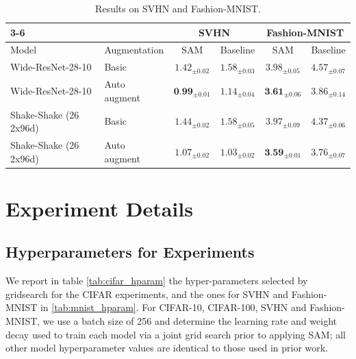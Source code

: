 \documentclass{article} %
\begin{document}
\begin{table}[h]
\caption{Results on SVHN and Fashion-MNIST.}
\vspace{0.1cm}
\label{tab:svhn_results}
\centering
\begin{tabular}{ll|cc|cc|}
\cline{3-6}
                                             &                                        & \multicolumn{2}{c|}{SVHN} & \multicolumn{2}{c|}{Fashion-MNIST} \\ \hline
\multicolumn{1}{|l|}{Model}                  & Augmentation & SAM      & Baseline      & SAM           & Baseline          \\ \hline
\multicolumn{1}{|l|}{Wide-ResNet-28-10}      & Basic         & $1.42_{\pm 0.02}$          & $1.58_{\pm 0.03}$         & $3.98_{\pm 0.05}$     & $4.57_{\pm 0.07}$              \\
\multicolumn{1}{|l|}{Wide-ResNet-28-10}      & Auto augment  & $\textbf{0.99}_{\pm 0.01}$ & $1.14_{\pm 0.04}$          & $\textbf{3.61}_{\pm 0.06}$     & $3.86_{\pm 0.14}$              \\ \hline
\multicolumn{1}{|l|}{Shake-Shake (26 2x96d)} & Basic        & $1.44_{\pm 0.02}$      & $1.58_{\pm 0.05}$         & $3.97_{\pm 0.09}$          & $4.37_{\pm 0.06}$              \\
\multicolumn{1}{|l|}{Shake-Shake (26 2x96d)} & Auto augment & $1.07_{\pm 0.02}$      & $1.03_{\pm 0.02}$         & $\textbf{3.59}_{\pm 0.01}$  & $3.76_{\pm 0.07}$              \\ \hline
\end{tabular}
\end{table}

\section{Experiment Details}

\subsection{Hyperparameters for Experiments}
\label{appendix:cifar_hparams}

We report in table \ref{tab:cifar_hparam} the hyper-parameters selected by gridsearch for the CIFAR experiments, and the ones for SVHN and Fashion-MNIST in \ref{tab:mnist_hparam}. For CIFAR-10, CIFAR-100, SVHN and Fashion-MNIST, we use a batch size of 256 and determine the learning rate and weight decay used to train each model via a joint grid search prior to applying SAM; all other model hyperparameter values are identical to those used in prior work.
\end{document}

